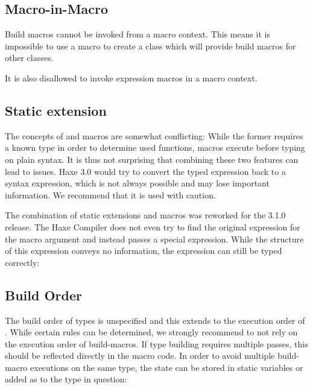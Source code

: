 \subsection{Macro-in-Macro}
\label{macro-limitations-macro-in-macro}

Build macros cannot be invoked from a macro context. This means it is impossible to use a macro to create a class which will provide build macros for other classes.


It is also disallowed to invoke expression macros in a macro context.



\subsection{Static extension}
\label{macro-limitations-static-extension}

The concepts of  and macros are somewhat conflicting: While the former requires a known type in order to determine used functions, macros execute before typing on plain syntax. It is thus not surprising that combining these two features can lead to issues. Haxe 3.0 would try to convert the typed expression back to a syntax expression, which is not always possible and may lose important information. We recommend that it is used with caution.


The combination of static extensions and macros was reworked for the 3.1.0 release. The Haxe Compiler does not even try to find the original expression for the macro argument and instead passes a special  expression. While the structure of this expression conveys no information, the expression can still be typed correctly:




\subsection{Build Order}
\label{macro-limitations-build-order}

The build order of types is unspecified and this extends to the execution order of . While certain rules can be determined, we strongly recommend to not rely on the execution order of build-macros. If type building requires multiple passes, this should be reflected directly in the macro code. In order to avoid multiple build-macro executions on the same type, the state can be stored in static variables or added as  to the type in question:

